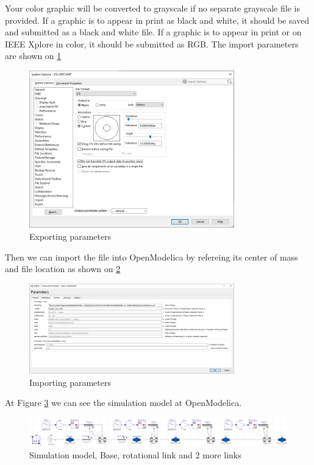 \documentclass[transmag]{IEEEtran}
\begin{document}
Your color graphic will be converted to grayscale if no separate grayscale 
file is provided. If a graphic is to appear in print as black and white, it 
should be saved and submitted as a black and white file. If a graphic is to 
appear in print or on IEEE Xplore in color, it should be submitted as RGB. The import parameters are shown on \ref{fig9} 

\begin{figure}
\centerline{\includegraphics[width=3.5in]{./images/exportSolidworks}}
\caption{Exporting parameters\label{fig9}}
\end{figure}

Then we can import the file into OpenModelica by refereing its center of mass and file location as shown on \ref{fig10}


\begin{figure}
\centerline{\includegraphics[width=3.5in]{./images/importOpenModelicaParameters}}
\caption{Importing parameters\label{fig10}}
\end{figure}


At Figure \ref{fig11} we can see the simulation model at OpenModelica.

\begin{figure}
\centerline{\includegraphics[width=7in]{./images/Simulation}}
\caption{Simulation model, Base, rotational link and 2 more links\label{fig11}}
\end{figure}
\end{document}
